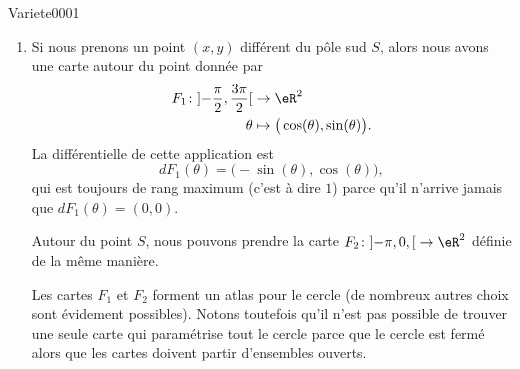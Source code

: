 
\begin{corrige}{Variete0001}

	\begin{enumerate}

		\item
			Si nous prenons un point $(x,y)$ différent du pôle sud $S$, alors nous avons une carte autour du point donnée par
			\begin{equation}
				\begin{aligned}
					F_1\colon \mathopen] -\frac{ \pi }{2} , \frac{ 3\pi }{ 2 } \mathclose[&\to \eR^2 \\
					\theta&\mapsto \big( \cos(\theta),\sin(\theta) \big).
				\end{aligned}
			\end{equation}
			La différentielle de cette application est
			\begin{equation}
				dF_1(\theta)=\big( -\sin(\theta),\cos(\theta) \big),
			\end{equation}
			qui est toujours de rang maximum (c'est à dire $1$) parce qu'il n'arrive jamais que $dF_1(\theta)=(0,0)$.

			Autour du point $S$, nous pouvons prendre la carte $F_2\colon \mathopen] -\pi,0 ,  \mathclose[\to \eR^2$ définie de la même manière.
			
			Les cartes $F_1$ et $F_2$ forment un atlas pour le cercle (de nombreux autres choix sont évidement possibles). Notons toutefois qu'il n'est pas possible de trouver une seule carte qui paramétrise tout le cercle parce que le cercle est fermé alors que les cartes doivent partir d'ensembles ouverts.


\end{enumerate}
\end{corrige}
